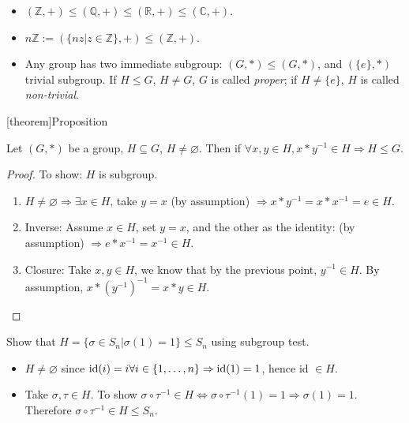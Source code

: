 \documentclass[12pt]{report}
\theoremstyle{definition}
\begin{document}
\begin{ex}
    \begin{itemize}
            \item  $(\mathbb{Z}, +) \le (\mathbb{Q}, +) \le (\mathbb{R}, +) \le (\mathbb{C}, +)$.
            \item $n\mathbb{Z} := (\{nz | z \in \mathbb{Z}\}, +) \le (\mathbb{Z}, +)$.
            \item Any group has two immediate subgroup: $(G, *) \le (G, *)$, and $(\{e\}, *)$ trivial subgroup.
                If $H \le G$, $H \neq G$, $G$ is called \emph{proper};
                if $H \neq \{e\}$, $H$ is called \emph{non-trivial}.
    \end{itemize}
    
   \end{ex}

[theorem]{Proposition}
\begin{subgroup test}
    Let $(G, *)$ be a group, $H \subseteq G$, $H \neq \varnothing$.
    Then if $\forall x, y \in H, x * y^{-1} \in H \Rightarrow{} H \le G$.
\end{subgroup test}

\begin{proof}
    To show: $H$ is subgroup.
    \begin{enumerate}
        \item $H \neq \varnothing \Rightarrow{} \exists x \in H$,
            take $y = x$ (by assumption) $\Rightarrow{} x*y^{-1} = x * x^{-1} = e \in H$.
        \item Inverse: Assume $x \in H$, set $y = x$, and the other as the identity:
            (by assumption) $\Rightarrow{} e * x^{-1} = x^{-1} \in H$.
        \item Closure: Take $x, y \in H$, we know that by the previous point, $y^{-1} \in H$.
        By assumption, $x * {(y^{-1})}^{-1} = x * y \in H$.
    \end{enumerate}
\end{proof}

\begin{ex}
    Show that $H = \{\sigma \in S_n | \sigma(1) = 1 \} \le S_n$ using subgroup test.
    \begin{itemize}
        \item $H \neq \varnothing$ since $\textnormal{id}(i) = i \forall i \in
            \{1, \ldots, n\} \Rightarrow{} \textnormal{id}(1) = 1$, hence id $\in H$.
        \item Take $\sigma, \tau \in H$. To show $\sigma \circ \tau^{-1} \in H
            \iff \sigma \circ \tau^{-1}(1) = 1 \Rightarrow{} \sigma(1) = 1$.
            Therefore $\sigma \circ \tau^{-1} \in H \le S_n$.
    \end{itemize}
\end{ex}
\end{document}
